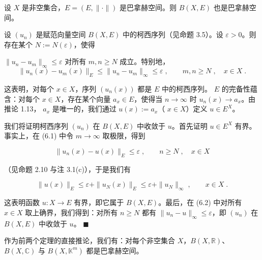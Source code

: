 \begin{theorem}

设 $X$ 是非空集合，$E = (E, \|\cdot\|)$ 是巴拿赫空间。则 $B(X, E)$ 也是巴拿赫空间。

\proofhead
设  $ (u_n) $ 是赋范向量空间  $ B(X, E) $ 中的柯西序列（见命题 3.5）。设  $ \varepsilon > 0 $。则存在某个  $ N := N(\varepsilon) $，使得

 $ \|u_n - u_m\|_\infty \leq \varepsilon $ 对所有  $ m, n \geq N $ 成立。特别地，
\begin{equation}
\|u_{n}(x)-u_{m}(x)\|_{E}\leq\|u_{n}-u_{m}\|_{\infty}\leq\varepsilon\;,\qquad m,n\geq N\;,\quad x\in X\;.
\end{equation}

这表明，对每个  $ x \in X $，序列  $ (u_n(x)) $ 都是  $ E $ 中的柯西序列。 $ E $ 的完备性蕴含：对每个  $ x \in X $，存在某个向量  $ a_x \in E $，使得当  $ n \to \infty $ 时  $ u_n(x) \to a_x $。由推论 1.13， $ a_x $ 是唯一的，我们通过  $ u(x) := a_x $（ $ x \in X $）定义  $ u \in E^X $。

我们将证明柯西序列  $ (u_n) $ 在  $ B(X, E) $ 中收敛于  $ u $。首先证明  $ u \in E^X $ 有界。事实上，在 (6.1) 中令  $ m \to \infty $ 取极限，得到

\begin{equation}
\|u_{n}(x)-u(x)\|_{E}\leq\varepsilon\;,\qquad n\geq N\;,\quad x\in X
\end{equation}

（见命题 2.10 与注 3.1(c)），于是我们有

\[
\|u(x)\|_{E}\leq\varepsilon+\|u_{N}(x)\|_{E}\leq\varepsilon+\|u_{N}\|_{\infty}\;,\qquad x\in X\;.
\]

这表明函数  $ u: X \to E $ 有界，即它属于  $ B(X, E) $。最后，在 (6.2) 中对所有  $ x \in X $ 取上确界，我们得到：对所有  $ n \geq N $ 都有  $ \|u_n - u\|_\infty \leq \varepsilon $，即  $ (u_n) $ 在  $ B(X, E) $ 中收敛于  $ u $。 $ \blacksquare $

\end{theorem}

作为前两个定理的直接推论，我们有：对每个非空集合 $X$，$B(X, \mathbb{R})$、$B(X, \mathbb{C})$ 与 $B(X, \mathbb{K}^m)$ 都是巴拿赫空间。

